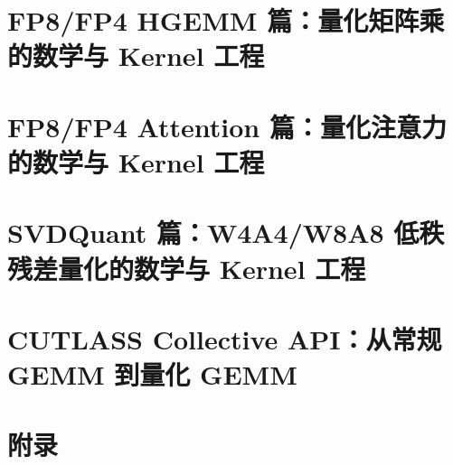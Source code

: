 \documentclass[9pt,openany]{ctexbook}
\begin{document}
\part{FP8/FP4 HGEMM 篇：量化矩阵乘的数学与 Kernel 工程}





\part{FP8/FP4 Attention 篇：量化注意力的数学与 Kernel 工程}








\part{SVDQuant 篇：W4A4/W8A8 低秩残差量化的数学与 Kernel 工程}





\part{CUTLASS Collective API：从常规 GEMM 到量化 GEMM}


\part{附录}
\appendix






\backmatter
\end{document}
